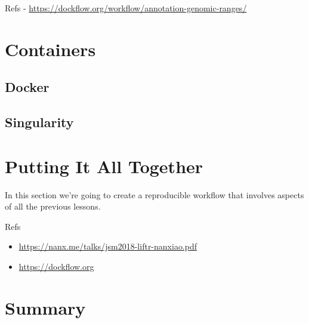 \documentclass[]{book}
\providecommand{\tightlist}{%
  \setlength{\itemsep}{0pt}\setlength{\parskip}{0pt}}
\begin{document}
Refs - \url{https://dockflow.org/workflow/annotation-genomic-ranges/}

\hypertarget{containers}{%
\chapter{Containers}\label{containers}}

\hypertarget{docker}{%
\section{Docker}\label{docker}}

\hypertarget{singularity}{%
\section{Singularity}\label{singularity}}

\hypertarget{putting-it-all-together}{%
\chapter{Putting It All Together}\label{putting-it-all-together}}

In this section we're going to create a reproducible workflow that
involves aspects of all the previous lessons.

Refs

\begin{itemize}
\tightlist
\item
  \url{https://nanx.me/talks/jsm2018-liftr-nanxiao.pdf}
\item
  \url{https://dockflow.org}
\end{itemize}

\hypertarget{summary}{%
\chapter{Summary}\label{summary}}


\end{document}
